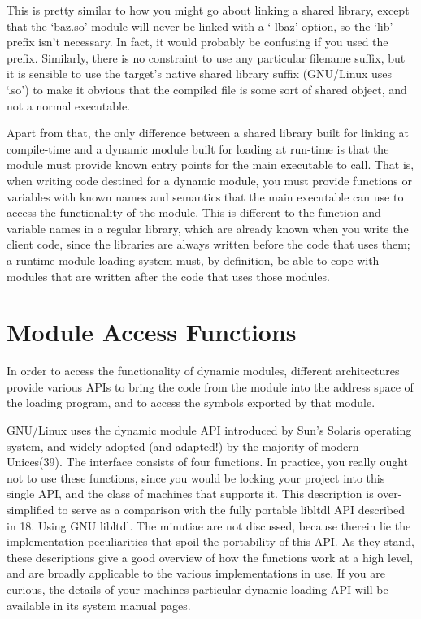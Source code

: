 This is pretty similar to how you might go about linking a shared library, except that the `baz.so' module will never be linked with a `-lbaz' option, so the `lib' prefix isn't necessary. In fact, it would probably be confusing if you used the prefix. Similarly, there is no constraint to use any particular filename suffix, but it is sensible to use the target's native shared library suffix (GNU/Linux uses `.so') to make it obvious that the compiled file is some sort of shared object, and not a normal executable.

Apart from that, the only difference between a shared library built for linking at compile-time and a dynamic module built for loading at run-time is that the module must provide known entry points for the main executable to call. That is, when writing code destined for a dynamic module, you must provide functions or variables with known names and semantics that the main executable can use to access the functionality of the module. This is different to the function and variable names in a regular library, which are already known when you write the client code, since the libraries are always written before the code that uses them; a runtime module loading system must, by definition, be able to cope with modules that are written after the code that uses those modules. 

\section{Module Access Functions}

In order to access the functionality of dynamic modules, different architectures provide various APIs to bring the code from the module into the address space of the loading program, and to access the symbols exported by that module.

GNU/Linux uses the dynamic module API introduced by Sun's Solaris operating system, and widely adopted (and adapted!) by the majority of modern Unices(39). The interface consists of four functions. In practice, you really ought not to use these functions, since you would be locking your project into this single API, and the class of machines that supports it. This description is over-simplified to serve as a comparison with the fully portable libltdl API described in 18. Using GNU libltdl. The minutiae are not discussed, because therein lie the implementation peculiarities that spoil the portability of this API. As they stand, these descriptions give a good overview of how the functions work at a high level, and are broadly applicable to the various implementations in use. If you are curious, the details of your machines particular dynamic loading API will be available in its system manual pages. 

